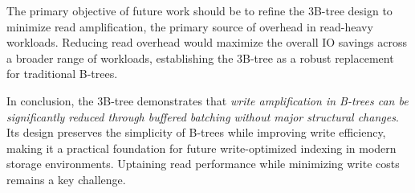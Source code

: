 The primary objective of future work should be to refine the 3B-tree design to minimize read amplification, the primary source of overhead in read-heavy workloads.
Reducing read overhead would maximize the overall \ac{IO} savings across a broader range of workloads, establishing the 3B-tree as a robust replacement for traditional B-trees.

In conclusion, the 3B-tree demonstrates that \emph{write amplification in B-trees can be significantly reduced through buffered batching without major structural changes}. 
Its design preserves the simplicity of B-trees while improving write efficiency, making it a practical foundation for future write-optimized indexing in modern storage environments.
Uptaining read performance while minimizing write costs remains a key challenge.
